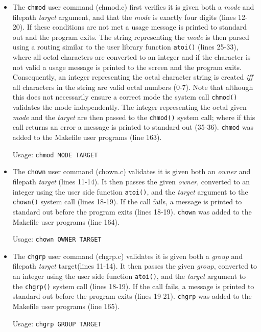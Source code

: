 \documentclass[11pt,letterpaper]{report}
\begin{document}
	\begin{itemize}
	
		\item The {\tt chmod} user command (chmod.c) first verifies it is given both a \emph{mode} and filepath \emph{target} argument, and that the \emph{mode} is exactly four digits (lines 12-20). If these conditions are not met a usage message is printed to standard
			out and the program exits. The string representing the \emph{mode} is then parsed using a routing similar to the user library function {\tt atoi()} (lines 25-33), where all octal characters are converted to an integer and if the character is not valid a usage
			message is printed to the screen and the program exits. Consequently, an integer representing the octal character string is created \emph{iff} all characters in the string are valid octal numbers (0-7). Note that although this does not necessarily ensure a correct mode
			the system call {\tt chmod()} validates the mode independently. The integer representing the octal given \emph{mode} and the \emph{target} are then passed to the {\tt chmod()} system call; where if this call 
			returns an error a message is printed to standard out (35-36). 
			{\tt chmod} was added to the Makefile user programs (line 163).
			
			Usage: {\tt chmod MODE TARGET}
			
		\item The {\tt chown} user command (chown.c) validates it is given both an \emph{owner} and filepath \emph{target} (lines 11-14). It then passes the given \emph{owner}, converted to an integer using the user side function {\tt atoi()}, and the \emph{target} 
			argument to the {\tt chown()} system call (lines 18-19). If the call fails, a message is printed to standard out before the program exits (lines 18-19).
			{\tt chown} was added to the Makefile user programs (line 164).
			
			Usage: {\tt chown OWNER TARGET}
			
		\item The {\tt chgrp} user command (chgrp.c) validates it is given both a \emph{group} and filepath \emph{target} target(lines 11-14). It then passes the given \emph{group}, converted to an integer using the user side function {\tt atoi()}, and the \emph{target} 
			argument to the {\tt chgrp()} system call (lines 18-19). If the call fails, a message is printed to standard out before the program exits (lines 19-21).
			{\tt chgrp} was added to the Makefile user programs (line 165).
			
			Usage: {\tt chgrp GROUP TARGET}
			

	\end{itemize}
	
\end{document}
